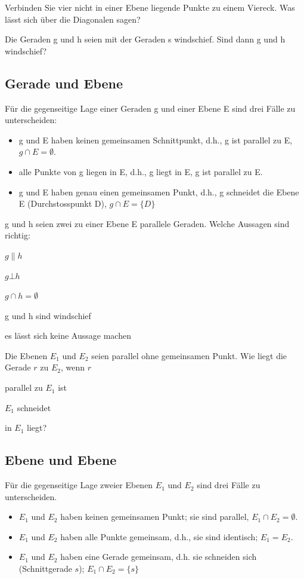 \documentclass[%
11pt,%
twoside,%
titlepage,%
german,%
headsepline%
]{scrartcl}
\begin{document}
\begin{ueb}
Verbinden Sie vier nicht in einer Ebene liegende Punkte zu einem Viereck. Was l\"asst sich \"uber die Diagonalen sagen?
\end{ueb}
\begin{ueb}
Die Geraden g und h seien mit der Geraden s windschief. Sind dann g und h windschief?
\end{ueb}

\subsection{Gerade und Ebene}
F\"ur die gegenseitige Lage einer Geraden g und einer Ebene E sind drei F\"alle zu unterscheiden:
\begin{itemize}
\item g und E haben keinen gemeinsamen Schnittpunkt, d.h., g ist parallel zu E, $g\cap E=\emptyset$.
\item alle Punkte von g liegen in E, d.h., g liegt in E, g ist parallel zu E.
\item g und E haben genau einen gemeinsamen Punkt, d.h., g schneidet die Ebene E (Durchstosspunkt D), $g\cap E=\{D\}$
\end{itemize}

\begin{ueb}
g und h seien zwei zu einer Ebene E parallele Geraden. Welche Aussagen sind richtig:
\begin{enumeratea}
\item $g\| h$
\item $g\bot h$
\item $g\cap h=\emptyset$
\item g und h sind windschief
\item es l\"asst sich keine Aussage machen
\end{enumeratea}
\end{ueb}

\begin{ueb}
Die Ebenen $E_1$ und $E_2$ seien parallel ohne gemeinsamen Punkt. Wie liegt die Gerade $r$ zu $E_2$, wenn $r$
\begin{enumeratea}
\item parallel zu $E_1$ ist
\item $E_1$ schneidet
\item in $E_1$ liegt?
\end{enumeratea}
\end{ueb}

\subsection{Ebene und Ebene}
F\"ur die gegenseitige Lage zweier Ebenen $E_1$ und $E_2$ sind drei F\"alle zu unterscheiden.
\begin{itemize}
\item $E_1$ und $E_2$ haben keinen gemeinsamen Punkt; sie sind parallel, $E_1\cap E_2=\emptyset$.
\item $E_1$ und $E_2$ haben alle Punkte gemeinsam, d.h., sie sind identisch; $E_1=E_2$.
\item $E_1$ und $E_2$ haben eine Gerade gemeinsam, d.h. sie schneiden sich (Schnittgerade $s$); $E_1\cap E_2=\{s\}$
\end{itemize}
\end{document}
